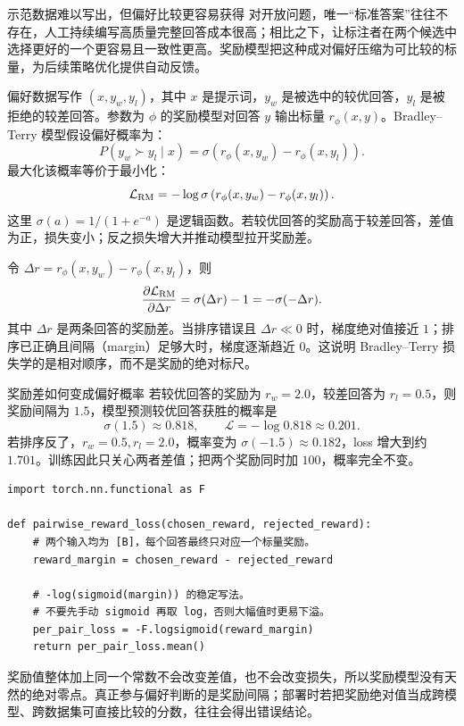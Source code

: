 \begin{motivationbox}{示范数据难以写出，但偏好比较更容易获得}
对开放问题，唯一“标准答案”往往不存在，人工持续编写高质量完整回答成本很高；相比之下，让标注者在两个候选中选择更好的一个更容易且一致性更高。奖励模型把这种成对偏好压缩为可比较的标量，为后续策略优化提供自动反馈。
\end{motivationbox}

偏好数据写作 $(x,y_w,y_l)$，其中 $x$ 是提示词，$y_w$ 是被选中的较优回答，$y_l$ 是被拒绝的较差回答。参数为 $\phi$ 的奖励模型对回答 $y$ 输出标量 $r_\phi(x,y)$。Bradley--Terry 模型假设偏好概率为：
\[
P(y_w\succ y_l\mid x)=\sigma\left(r_\phi(x,y_w)-r_\phi(x,y_l)\right).
\]
最大化该概率等价于最小化：
\[
\mathcal L_{\rm RM}
=-\log\sigma\left(r_\phi(x,y_w)-r_\phi(x,y_l)\right).
\]
这里 $\sigma(a)=1/(1+e^{-a})$ 是逻辑函数。若较优回答的奖励高于较差回答，差值为正，损失变小；反之损失增大并推动模型拉开奖励差。

令 $\Delta r=r_\phi(x,y_w)-r_\phi(x,y_l)$，则
\[
\frac{\partial\mathcal L_{\rm RM}}{\partial\Delta r}
=\sigma(\Delta r)-1=-\sigma(-\Delta r).
\]
其中 $\Delta r$ 是两条回答的奖励差。当排序错误且 $\Delta r\ll0$ 时，梯度绝对值接近 $1$；排序已正确且间隔（margin）足够大时，梯度逐渐趋近 $0$。这说明 Bradley--Terry 损失学的是相对顺序，而不是奖励的绝对标尺。

\begin{examplebox}{奖励差如何变成偏好概率}
若较优回答的奖励为 $r_w=2.0$，较差回答为 $r_l=0.5$，则奖励间隔为 $1.5$，模型预测较优回答获胜的概率是
\[
\sigma(1.5)\approx0.818,
\qquad \mathcal L=-\log0.818\approx0.201.
\]
若排序反了，$r_w=0.5,r_l=2.0$，概率变为 $\sigma(-1.5)\approx0.182$，loss 增大到约 $1.701$。训练因此只关心两者差值；把两个奖励同时加 $100$，概率完全不变。
\end{examplebox}


\begin{lstlisting}
import torch.nn.functional as F

def pairwise_reward_loss(chosen_reward, rejected_reward):
    # 两个输入均为 [B]，每个回答最终只对应一个标量奖励。
    reward_margin = chosen_reward - rejected_reward

    # -log(sigmoid(margin)) 的稳定写法。
    # 不要先手动 sigmoid 再取 log，否则大幅值时更易下溢。
    per_pair_loss = -F.logsigmoid(reward_margin)
    return per_pair_loss.mean()
\end{lstlisting}

奖励值整体加上同一个常数不会改变差值，也不会改变损失，所以奖励模型没有天然的绝对零点。真正参与偏好判断的是奖励间隔；部署时若把奖励绝对值当成跨模型、跨数据集可直接比较的分数，往往会得出错误结论。

